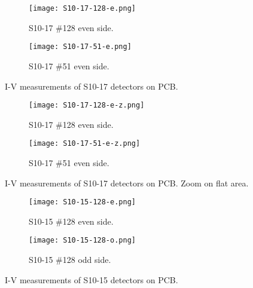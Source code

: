 \documentclass[../main/thesis.tex]{subfiles}
\begin{document}
\begin{figure}
	\centering
	\begin{subfigure}{.5\textwidth}
		\centering
		\texttt{[image: S10-17-128-e.png]}
		\caption{S10-17 \#128 even side.}
		\label{fig-S10-17-128-e}
	\end{subfigure}%
	\begin{subfigure}{.5\textwidth}
		\centering
		\texttt{[image: S10-17-51-e.png]}
		\caption{S10-17 \#51 even side.}
		\label{fig-S10-17-51-e} 
	\end{subfigure}
	\caption{I-V measurements of S10-17 detectors on PCB.}
	\label{fig-3d-iv-S10-17}
\end{figure}

\begin{figure}
	\centering
	\begin{subfigure}{.5\textwidth}
		\centering
		\texttt{[image: S10-17-128-e-z.png]}
		\caption{S10-17 \#128 even side.}
		\label{fig-S10-17-128-e-z}
	\end{subfigure}%
	\begin{subfigure}{.5\textwidth}
		\centering
		\texttt{[image: S10-17-51-e-z.png]}
		\caption{S10-17 \#51 even side.}
		\label{fig-S10-17-51-e-z} 
	\end{subfigure}
	\caption{I-V measurements of S10-17 detectors on PCB. Zoom on flat area.}
	\label{fig-3d-iv-S10-17-z}
\end{figure}

\begin{figure}
	\centering
	\begin{subfigure}{.5\textwidth}
		\centering
		\texttt{[image: S10-15-128-e.png]}
		\caption{S10-15 \#128 even side.}
		\label{fig-S10-15-128-e}
	\end{subfigure}%
	\begin{subfigure}{.5\textwidth}
		\centering
		\texttt{[image: S10-15-128-o.png]}
		\caption{S10-15 \#128 odd side.}
		\label{fig-S10-15-128-o}
	\end{subfigure}
	\caption{I-V measurements of S10-15 detectors on PCB.}
	\label{fig-3d-iv-S10-15}
\end{figure}
\end{document}
